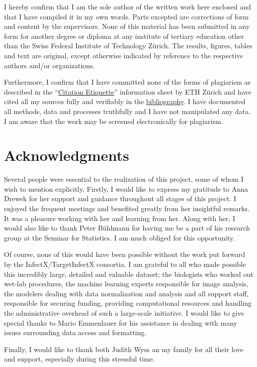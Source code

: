 I hereby confirm that I am the sole author of the written work here enclosed and that I have compiled it in my own words. Parts excepted are corrections of form and content by the supervisors. None of this material has been submitted in any form for another degree or diploma at any institute of tertiary education other than the Swiss Federal Institute of Technology Z\"urich. The results, figures, tables and text are original, except otherwise indicated by reference to the respective authors and/or organizations.

Furthermore, I confirm that I have committed none of the forms of plagiarism as described in the ``\href{https://www.ethz.ch/content/dam/ethz/main/education/rechtliches-abschluesse/leistungskontrollen/plagiarism-citationetiquette.pdf}{Citation Etiquette}'' information sheet by ETH Z\"urich and have cited all my sources fully and verifiably in the \hyperref[ch:bibliography]{bibliography}. I have documented all methods, data and processes truthfully and I have not manipulated any data. I am aware that the work may be screened electronically for plagiarism.

\section*{Acknowledgments}

Several people were essential to the realization of this project, some of whom I wish to mention explicitly. Firstly, I would like to express my gratitude to Anna Drewek for her support and guidance throughout all stages of this project. I enjoyed the frequent meetings and benefited greatly from her insightful remarks. It was a pleasure working with her and learning from her. Along with her, I would also like to thank Peter B\"uhlmann for having me be a part of his research group at the Seminar for Statistics. I am much obliged for this opportunity.

Of course, none of this would have been possible without the work put forward by the InfectX/TargetInfectX consortia. I am grateful to all who made possible this incredibly large, detailed and valuable dataset; the biologists who worked out wet-lab procedures, the machine learning experts responsible for image analysis, the modelers dealing with data normalization and analysis and all support staff, responsible for securing funding, providing computational resources and handling the administrative overhead of such a large-scale initiative. I would like to give special thanks to Mario Emmenlauer for his assistance in dealing with many issues surrounding data access and formatting.

Finally, I would like to thank both Judith Wyss an my family for all their love and support, especially during this stressful time.
